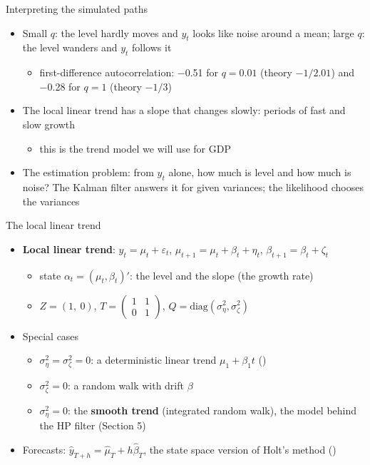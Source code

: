 \begin{frame}{Interpreting the simulated paths}
\itemsize{\small}
\begin{itemize}
    \item Small $q$: the level hardly moves and $y_t$ looks like noise around a mean; large $q$: the level wanders and $y_t$ follows it
    \begin{itemize}
        \item first-difference autocorrelation: \ensuremath{-}0.51 for $q = 0.01$ (theory $-1/2.01$) and \ensuremath{-}0.28 for $q = 1$ (theory $-1/3$)
    \end{itemize}
    \item The local linear trend has a slope that changes slowly: periods of fast and slow growth
    \begin{itemize}
        \item this is the trend model we will use for GDP
    \end{itemize}
    \item The estimation problem: from $y_t$ alone, how much is level and how much is noise? The Kalman filter answers it for given variances; the likelihood chooses the variances
\end{itemize}
\end{frame}

\begin{frame}{The local linear trend}
\itemsize{\small}
\begin{itemize}
    \item \textbf{Local linear trend}: $y_t = \mu_t + \varepsilon_t$, \quad $\mu_{t+1} = \mu_t + \beta_t + \eta_t$, \quad $\beta_{t+1} = \beta_t + \zeta_t$
    \begin{itemize}
        \item state $\alpha_t = (\mu_t, \beta_t)'$: the level and the slope (the growth rate)
        \item $Z = (1,\ 0)$, \quad $T = \begin{pmatrix}1 & 1\\ 0 & 1\end{pmatrix}$, \quad $Q = \mathrm{diag}(\sigma^2_\eta, \sigma^2_\zeta)$
    \end{itemize}
    \item Special cases
    \begin{itemize}
        \item $\sigma^2_\eta = \sigma^2_\zeta = 0$: a deterministic linear trend $\mu_1 + \beta_1 t$ ()
        \item $\sigma^2_\zeta = 0$: a random walk with drift $\beta$
        \item $\sigma^2_\eta = 0$: the \textbf{smooth trend} (integrated random walk), the model behind the HP filter (Section 5)
    \end{itemize}
    \item Forecasts: $\hat y_{T+h} = \hat\mu_T + h\hat\beta_T$, the state space version of Holt's method ()
\end{itemize}
\end{frame}

